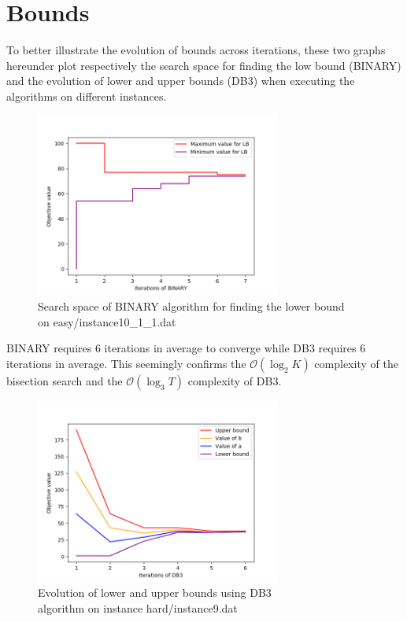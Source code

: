 \section{Bounds}
To better illustrate the evolution of bounds across iterations, these two graphs hereunder plot respectively
the search space for finding the low bound (BINARY) and the evolution of lower and upper bounds (DB3) when executing the algorithms on different instances.
\begin{figure}[h!]
    \begin{center}
        \includegraphics[width=0.72\textwidth]{../imgs/binary_bounds.png}
        \caption{Search space of BINARY algorithm for finding the
        lower bound \\ on easy/instance10\_1\_1.dat}
    \end{center}
\end{figure}

BINARY requires 6 iterations in average to converge while DB3 requires 6 iterations in average.
This seemingly confirms the $\mathcal{O}\left( \log_2 K \right)$ complexity of the bisection search
and the $\mathcal{O}(\log_3 T)$ complexity of DB3.

\begin{figure}[h!]
    \begin{center}
        \includegraphics[width=0.72\textwidth]{../imgs/db3_bounds.png}
        \caption{Evolution of lower and upper bounds using DB3 \\
        algorithm on instance hard/instance9.dat}
    \end{center}
\end{figure}
